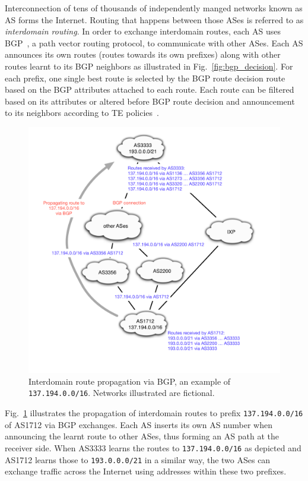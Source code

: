 Interconnection of tens of thousands of independently manged networks known as \ac{AS} forms the Internet.
Routing that happens between those ASes is referred to as 
\textit{interdomain routing}.
In order to exchange interdomain routes, each AS uses \ac{BGP}~\cite{bgp4}, a path vector routing protocol, to communicate with other ASes.
Each AS announces its own routes (routes towards its own prefixes) along with other routes learnt to its BGP neighbors as illustrated in Fig.~\ref{fig:bgp_decision}.
For each prefix, one single best route is selected by the BGP route decision route based on the BGP attributes attached to each route.
Each route can be filtered based on its attributes or altered before BGP route decision and announcement to its neighbors according to \ac{TE} policies~\cite{Quoitin2003, Gao2001a}.

\begin{figure}[!htb]
\centering
\includegraphics[width=1.1\textwidth]{gfx/chap1/bgp_route_propagation.pdf}
\caption{Interdomain route propagation via \ac{BGP}, an example of \texttt{137.194.0.0/16}. Networks illustrated are fictional.}
\label{fig:bgp_propa}
\end{figure}

Fig.~\ref{fig:bgp_propa} illustrates the propagation of interdomain routes to prefix \texttt{137.194.0.0/16} of AS1712 via BGP exchanges. Each AS inserts its own AS number when announcing the learnt route to other ASes, thus forming an AS path at the receiver side. When AS3333 learns the routes to \texttt{137.194.0.0/16} as depicted and AS1712 learns those to \texttt{193.0.0.0/21} in a similar way, the two ASes can exchange traffic across the Internet using addresses within these two prefixes.

